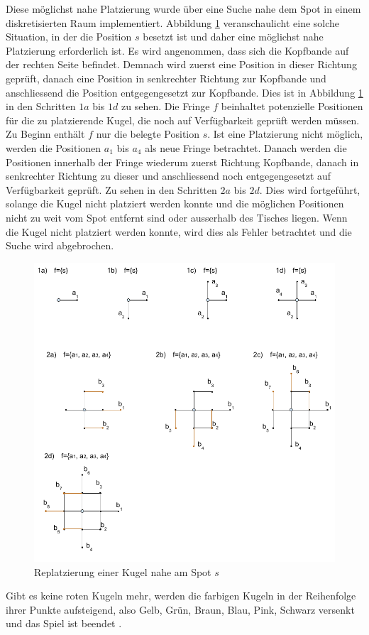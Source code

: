 Diese möglichst nahe Platzierung wurde über eine Suche nahe dem Spot in einem diskretisierten Raum implementiert.
Abbildung \ref{fig:snooker_spot_replacement} veranschaulicht eine solche Situation, in der die Position $s$ besetzt
ist und daher eine möglichst nahe Platzierung erforderlich ist.
Es wird angenommen, dass sich die Kopfbande auf der rechten Seite befindet. Demnach wird zuerst eine Position in dieser
Richtung geprüft, danach eine Position in senkrechter Richtung zur Kopfbande und anschliessend die Position entgegengesetzt
zur Kopfbande.
Dies ist in Abbildung \ref{fig:snooker_spot_replacement} in den Schritten $1a$ bis $1d$ zu sehen.
Die Fringe $f$ beinhaltet potenzielle Positionen für die zu platzierende Kugel, die noch auf Verfügbarkeit geprüft werden müssen.
Zu Beginn enthält $f$ nur die belegte Position $s$.
Ist eine Platzierung nicht möglich, werden die Positionen $a_1$ bis $a_4$ als neue Fringe betrachtet. Danach werden die Positionen
innerhalb der Fringe wiederum zuerst Richtung Kopfbande, danach in senkrechter Richtung zu dieser und anschliessend noch entgegengesetzt
auf Verfügbarkeit geprüft. Zu sehen in den Schritten $2a$ bis $2d$. Dies wird fortgeführt, solange die Kugel nicht platziert
werden konnte und die möglichen Positionen nicht zu weit vom Spot entfernt sind oder ausserhalb des Tisches liegen.
Wenn die Kugel nicht platziert werden konnte, wird dies als Fehler betrachtet und die Suche wird abgebrochen.

\begin{figure}[h!]
    \begin{center}
        \includegraphics[width=0.6\linewidth]{../common/03_billiard_ai/resources/40_replatzierung_kugel.png}
    \end{center}
    \caption{Replatzierung einer Kugel nahe am Spot $s$}
    \label{fig:snooker_spot_replacement}
\end{figure}

Gibt es keine roten Kugeln mehr, werden die farbigen Kugeln in der Reihenfolge ihrer Punkte aufsteigend,
also Gelb, Grün, Braun, Blau, Pink, Schwarz versenkt und das Spiel ist beendet \cite{stoppball:spielregel:snooker}.
